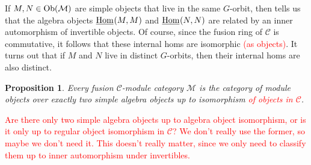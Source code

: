 \documentclass[12pt, reqno]{amsart}
\numberwithin{equation}{section}
\theoremstyle{plainspace}
\newtheorem{proposition}[theorem]{Proposition}
\theoremstyle{definitionspace}
\theoremstyle{remarkspace}
\newcommand{\mathcat}[1]{\mathcal{#1}}
\newcommand{\Ob}{\textup{Ob}}
\newcommand{\IntHom}[2][]{
	\ifthenelse{\equal{#2}{}}
		{\underline{\textup{Hom}}_{#1}}
		{\underline{\textup{Hom}}_{#1}\!\left(#2\right)}
}
\begin{document}
\newline

\noindent If $M, N \in \Ob(\mathcat{M})$ are simple objects that live in the same $G$-orbit, then \cite[Lemma 3.3]{Ostrik_2003} tells us that the algebra objects $\IntHom{M, M}$ and $\IntHom{N, N}$ are related by an inner automorphism of invertible objects. Of course, since the fusion ring of $\mathcat{C}$ is commutative, it follows that these internal homs are isomorphic \textcolor{red}{(as objects)}. It turns out that if $M$ and $N$ live in distinct $G$-orbits, then their internal homs are also distinct.
\newline

\begin{proposition}\label{prop:near-group_algebra_equivalence_classes}
Every fusion $\mathcat{C}$-module category $\mathcat{M}$ is the category of module objects over exactly two simple algebra objects up to isomorphism \textcolor{red}{of objects in $\mathcat{C}$}.
\end{proposition}
\leavevmode

\noindent \textcolor{red}{Are there only two simple algebra objects up to algebra object isomorphism, or is it only up to regular object isomorphism in $\mathcat{C}$? We don't really use the former, so maybe we don't need it. This doesn't really matter, since we only need to classify them up to inner automorphism under invertibles.}
\newline
\end{document}
